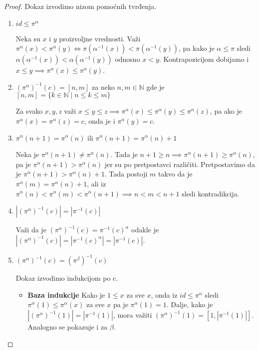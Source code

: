 \documentclass[12pt,oneside]{memoir}
\theoremstyle{definition}
\begin{document}
  \begin{proof}
	  Dokaz izvodimo nizom pomoćnih tvrđenja.

	  \begin{enumerate}
		  \item $id \leq \pi^\alpha$

			  Neka su $x$ i $y$ proizvoljne vrednosti. Važi $\pi^\alpha(x) <
			  \pi^\alpha(y) \iff \pi(\alpha^{-1}(x)) < \pi(\alpha^{-1}(y))$, pa
			  kako je $\alpha \leq \pi$ sledi $\alpha(\alpha^{-1}(x)) <
			  \alpha(\alpha^{-1}(y))$ odnosno $x < y$. Kontrapozicijom dobijamo
			  i $x \leq y \implies \pi^\alpha(x) \leq \pi^\alpha(y)$.

		  \item $(\pi^\alpha)^{-1}(c) = [n, m]$ za neko $n, m \in \mathbb{N}$
			  gde je $[n, m] = \{k \in \mathbb{N} \mid n \leq k \leq m\}$

			  Za svako $x, y, z $ važi $x \leq y \leq z \implies \pi^\alpha(x)
			  \leq \pi^\alpha(y) \leq \pi^\alpha(z)$, pa ako je $\pi^\alpha(x)
			  = \pi^\alpha(z) = c$, onda je i $\pi^\alpha(y) = c$.

		  \item $\pi^\alpha(n + 1) = \pi^\alpha(n)$ ili $\pi^\alpha(n+1) =
			  \pi^\alpha(n) + 1$

			  Neka je $\pi^\alpha(n+1) \neq \pi^\alpha(n)$. Tada je $n + 1 \geq
			  n \implies \pi^\alpha(n+1) \geq \pi^\alpha(n)$, pa je
			  $\pi^\alpha(n+1) > \pi^\alpha(n)$ jer su po pretpostavci
			  različiti. Pretpostavimo da je $\pi^\alpha(n+1) > \pi^\alpha(n) +
			  1$. Tada postoji $m$ takvo da je $\pi^\alpha(m) = \pi^\alpha(n) +
			  1$, ali iz $\pi^\alpha(n) < \pi^\alpha(m) < \pi^\alpha(n+1)
			  \implies n < m < n + 1$ sledi kontradikcija.

		  \item $|(\pi^\alpha)^{-1}(c)| = |\pi^{-1}(c)|$

			  Važi da je $(\pi^\alpha)^{-1}(c) = \pi^{-1}(c)^\alpha$ odakle je
			  $|(\pi^\alpha)^{-1}(c)| = |\pi^{-1}(c)^\alpha| = |\pi^{-1}(c)|$.

		  \item $(\pi^\alpha)^{-1}(c) = (\pi^\beta)^{-1}(c)$

			  Dokaz izvodimo indukcijom po $c$.

			  \begin{itemize}
				  \item[] \textbf{Baza indukcije} Kako je $1 \leq x$ za sve
					  $x$, onda iz $id \leq \pi^\alpha$ sledi $\pi^\alpha(1)
					  \leq \pi^\alpha(x)$ za sve $x$ pa je $\pi^\alpha(1) = 1$.
					  Dalje, kako je $|(\pi^\alpha)^{-1}(1)| = |\pi^{-1}(1)|$,
					  mora važiti $(\pi^\alpha)^{-1}(1) = [1, |\pi^{-1}(1)|]$.
					  Analogno se pokazuje i za $\beta$.


\end{itemize}
\end{enumerate}
\end{proof}
\end{document}
